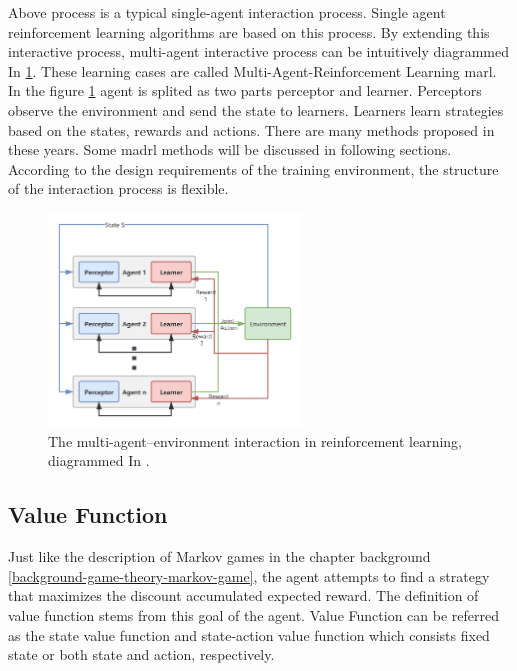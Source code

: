 Above process is a typical single-agent interaction process. Single agent reinforcement learning algorithms are based on this process. By extending this interactive process, multi-agent interactive process can be intuitively diagrammed In \ref{fig:multi-agent-environment-interaction}. These learning cases are called Multi-Agent-Reinforcement Learning \gls{marl}. In the figure \ref{fig:multi-agent-environment-interaction} agent is splited as two parts perceptor and learner. Perceptors observe the environment and send the state to learners. Learners learn strategies based on the states, rewards and actions. There are many methods proposed in these years. Some \gls{madrl} methods will be discussed in following sections. According to the design requirements of the training environment, the structure of the interaction process is flexible.

\begin{figure}[htbp]
\centering
\includegraphics[width=0.6\textwidth]{./images/multi-agent-environment-interaction.png}
\caption{The multi-agent–environment interaction in reinforcement learning, diagrammed In \parencite{en13010123}.}
\label{fig:multi-agent-environment-interaction}
\end{figure}

\subsection{Value Function} \label{background:value-function}
Just like the description of Markov games in the chapter background \ref{background-game-theory-markov-game}, the agent attempts to find a strategy that maximizes the discount accumulated expected reward. The definition of value function stems from this goal of the agent. Value Function can be referred as the state value function and state-action value function which consists fixed state or both state and action, respectively.

